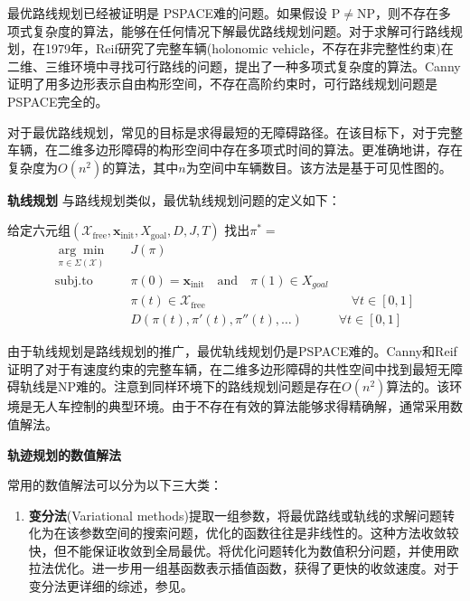 \begin{enumerate}[wide=\parindent]
最优路线规划已经被证明是 PSPACE难的问题\cite{Reif1979Complexity}。如果假设 $\mathrm{P}\neq \mathrm{NP}$，则不存在多项式复杂度的算法，能够在任何情况下解最优路线规划问题。对于求解可行路线规划，在1979年，Reif\cite{Reif1979Complexity}研究了完整车辆(holonomic vehicle，不存在非完整性约束)在二维、三维环境中寻找可行路线的问题，提出了一种多项式复杂度的算法。Canny\cite{Canny1988The}证明了用多边形表示自由构形空间，不存在高阶约束时，可行路线规划问题是PSPACE完全的。

对于最优路线规划，常见的目标是求得最短的无障碍路径。在该目标下，对于完整车辆，在二维多边形障碍的构形空间中存在多项式时间的算法\cite{Storer1994Shortest,Lozano1979An}。更准确地讲，存在复杂度为$O(n^2)$的算法，其中$n$为空间中车辆数目。该方法是基于可见性图的。

\textbf{轨线规划 } 与路线规划类似，最优轨线规划问题的定义如下：

\begin{definition}[最优轨线规划]
\label{def:trajectory}
给定六元组$(\mathcal{X}_{\mathrm{free}}, \mathbf{x}_{\mathrm{init}}, X_{\mathrm{goal}}, D, J, T)$ 找出$\pi^*=$
\begin{equation}
\begin{aligned}
\underset{\pi\in \Sigma(\mathcal{X})}{\arg\min}\quad & J(\pi) & \\
\mathrm{subj. to} \quad & \pi(0)=\mathbf{x}_{\mathrm{init}} \quad \mathrm{and} \quad \pi(1)\in X_{goal} & \\
\quad & \pi(t)\in \mathcal{X}_{\mathrm{free}} & \quad \forall t\in [0,1]\\
& D(\pi(t),\pi'(t),\pi''(t), \dots) & \forall t\in [0,1]
\end{aligned}
\end{equation}
\end{definition}

由于轨线规划是路线规划的推广，最优轨线规划仍是PSPACE难的。Canny和Reif\cite{Canny1987New}证明了对于有速度约束的完整车辆，在二维多边形障碍的共性空间中找到最短无障碍轨线是NP难的。注意到同样环境下的路线规划问题是存在$O(n^2)$算法的。该环境是无人车控制的典型环境。由于不存在有效的算法能够求得精确解，通常采用数值解法。

\textbf{轨迹规划的数值解法 }

常用的数值解法可以分为以下三大类：

\begin{enumerate}[label=(\arabic*),wide=\parindent]
\item \textbf{变分法}(Variational methods)提取一组参数，将最优路线或轨线的求解问题转化为在该参数空间的搜索问题，优化的函数往往是非线性的。这种方法收敛较快，但不能保证收敛到全局最优。将优化问题转化为数值积分问题，并使用欧拉法优化。进一步用一组基函数表示插值函数，获得了更快的收敛速度。对于变分法更详细的综述，参见。


\end{enumerate}
\end{enumerate}
